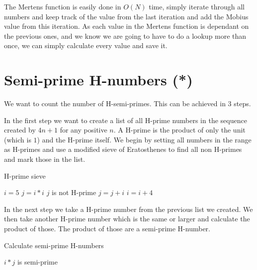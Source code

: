 \documentclass[11pt,a4paper,twoside]{article}
\begin{document}
The Mertens function is easily done in $O(N)$ time, simply iterate through all
numbers and keep track of the value from the last iteration and add the Mobius
value from this iteration. As each value in the Mertens function is dependant
on the previous ones, and we know we are going to have to do a lookup more than
once, we can simply calculate every value and save it.

\section{Semi-prime H-numbers (*)}
We want to count the number of H-semi-primes. This can be achieved in $3$ steps.

In the first step we want to create a list of all H-prime numbers in the
sequence created by $4n + 1$ for any positive $n$. A H-prime is the product of
only the unit (which is $1$) and the H-prime itself. We begin by setting all
numbers in the range as H-primes and use a modified sieve of Eratosthenes to
find all non H-primes and mark those in the list.


\begin{algorithm}
    \caption{H-prime sieve}
    \label{H-prime sieve}
    \begin{algorithmic}
        \STATE $i = 5$
                \STATE $j = i*i$
                    \STATE $j$ is not H-prime %
                    \STATE $j = j + i$
                \ENDWHILE
            \ENDIF
            \STATE $i = i + 4$
        \ENDWHILE
    \end{algorithmic}
\end{algorithm}

In the next step we take a H-prime number from the previous list we created. We
then take another H-prime number which is the same or larger and calculate the
product of those. The product of those are a semi-prime H-number.

%
\begin{algorithm}
    \caption{Calculate semi-prime H-numbers}
    \label{Semi-prime H-numbers}
    \begin{algorithmic}
                \STATE $i * j$ is semi-prime
            \ENDFOR
        \ENDFOR
    \end{algorithmic}
\end{algorithm}
\end{document}
